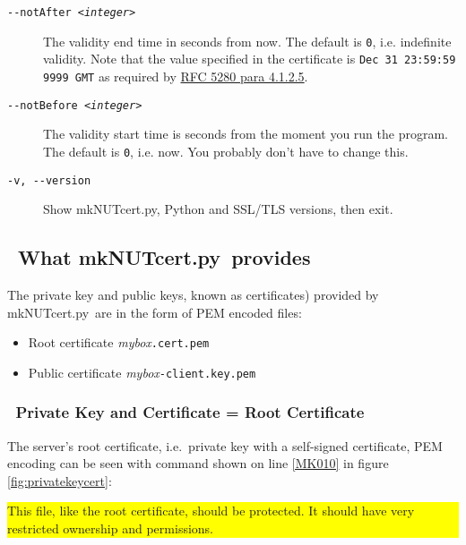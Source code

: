 \documentclass[12pt]{article}
\newlength{\headersep}\setlength{\headersep}{3mm}
\newcommand{\Hsep}{\hspace{\headersep}}
\newcommand{\newcolumn}{\vfill\eject}
\newcommand{\mkNUTcert}{\mbox{\textcolor{MKNUTCERTCOLOUR}{mkNUTcert.py}}}
\newcommand{\ul}{\begin{itemize}%
   \setlength{\itemsep}{0em}}
\newcommand{\eul}{\end{itemize}}
\newcommand{\li}{\item}                 %
\begin{document}
\begin{description}
\item[\texttt{-\/-notAfter \textit{<integer>}}] The validity end time
  in seconds from now.  The default is \texttt{0}, i.e.  indefinite
  validity.  Note that the value specified in the certificate is
  \texttt{Dec 31 23:59:59 9999 GMT} as required by
  \href{https://tools.ietf.org/html/rfc5280#section-4.1.2.5}{RFC 5280
    para 4.1.2.5}.

\item[\texttt{-\/-notBefore \textit{<integer>}}] The validity start
  time is seconds from the moment you run the program. The default is
  \texttt{0}, i.e. now.  You probably don't have to change this.

\item[\texttt{-v, -\/-version}] Show \mkNUTcert, Python and SSL/TLS versions,
  then exit.
\end{description}

\subsection{\Hsep\ What \mkNUTcert\ provides}\label{section:PEMencoding}

The private key and public keys, known as certificates) provided by
\mkNUTcert\ are in the form of PEM encoded files:
\ul
\li Root certificate \textsl{mybox}\texttt{.cert.pem}
\li Public certificate \textsl{mybox}\texttt{-client.key.pem}
\eul

\subsubsection{\Hsep\ Private Key and Certificate = Root Certificate}\label{section:privatekeycert}

The server's root certificate, i.e.\ private key with a self-signed
certificate, PEM encoding can be seen with command shown on line
\ref{MK010} in figure \ref{fig:privatekeycert}:

\begin{center}
\colorbox{yellow}{\parbox{0.7\LinePrinterwidth}{This file, like the root
    certificate, should be protected.  It should have very restricted
    ownership and permissions.}}
\end{center}
\end{document}
